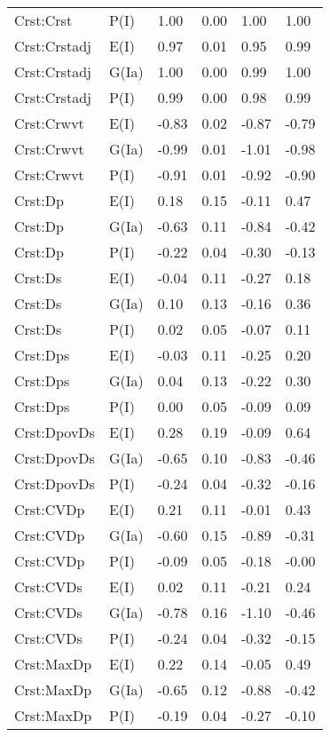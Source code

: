 \begin{center}
\begin{longtable}{|p{1.1in}|p{0.7in}|p{0.7in}|p{0.6in}|p{0.6in}|p{0.6in}|}
  Crst:Crst & P(I) & 1.00 & 0.00 & 1.00 & 1.00 \\ 
  Crst:Crstadj & E(I) & 0.97 & 0.01 & 0.95 & 0.99 \\ 
  Crst:Crstadj & G(Ia) & 1.00 & 0.00 & 0.99 & 1.00 \\ 
  Crst:Crstadj & P(I) & 0.99 & 0.00 & 0.98 & 0.99 \\ 
  Crst:Crwvt & E(I) & -0.83 & 0.02 & -0.87 & -0.79 \\ 
  Crst:Crwvt & G(Ia) & -0.99 & 0.01 & -1.01 & -0.98 \\ 
  Crst:Crwvt & P(I) & -0.91 & 0.01 & -0.92 & -0.90 \\ 
  Crst:Dp & E(I) & 0.18 & 0.15 & -0.11 & 0.47 \\ 
  Crst:Dp & G(Ia) & -0.63 & 0.11 & -0.84 & -0.42 \\ 
  Crst:Dp & P(I) & -0.22 & 0.04 & -0.30 & -0.13 \\ 
  Crst:Ds & E(I) & -0.04 & 0.11 & -0.27 & 0.18 \\ 
  Crst:Ds & G(Ia) & 0.10 & 0.13 & -0.16 & 0.36 \\ 
  Crst:Ds & P(I) & 0.02 & 0.05 & -0.07 & 0.11 \\ 
  Crst:Dps & E(I) & -0.03 & 0.11 & -0.25 & 0.20 \\ 
  Crst:Dps & G(Ia) & 0.04 & 0.13 & -0.22 & 0.30 \\ 
  Crst:Dps & P(I) & 0.00 & 0.05 & -0.09 & 0.09 \\ 
  Crst:DpovDs & E(I) & 0.28 & 0.19 & -0.09 & 0.64 \\ 
  Crst:DpovDs & G(Ia) & -0.65 & 0.10 & -0.83 & -0.46 \\ 
  Crst:DpovDs & P(I) & -0.24 & 0.04 & -0.32 & -0.16 \\ 
  Crst:CVDp & E(I) & 0.21 & 0.11 & -0.01 & 0.43 \\ 
  Crst:CVDp & G(Ia) & -0.60 & 0.15 & -0.89 & -0.31 \\ 
  Crst:CVDp & P(I) & -0.09 & 0.05 & -0.18 & -0.00 \\ 
  Crst:CVDs & E(I) & 0.02 & 0.11 & -0.21 & 0.24 \\ 
  Crst:CVDs & G(Ia) & -0.78 & 0.16 & -1.10 & -0.46 \\ 
  Crst:CVDs & P(I) & -0.24 & 0.04 & -0.32 & -0.15 \\ 
  Crst:MaxDp & E(I) & 0.22 & 0.14 & -0.05 & 0.49 \\ 
  Crst:MaxDp & G(Ia) & -0.65 & 0.12 & -0.88 & -0.42 \\ 
  Crst:MaxDp & P(I) & -0.19 & 0.04 & -0.27 & -0.10 \\ 

\end{longtable}
\end{center}
